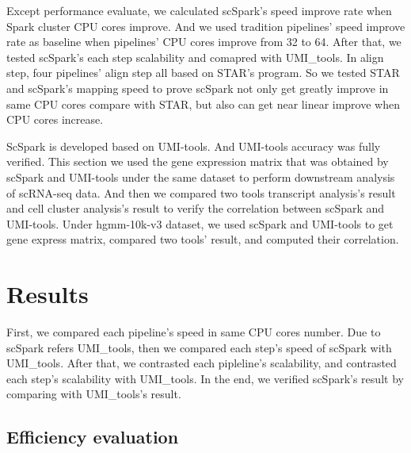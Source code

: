 \documentclass[conference]{IEEEtran}
\begin{document}
Except performance evaluate, we calculated scSpark's speed improve rate when Spark cluster CPU cores improve.
And we used tradition pipelines' speed improve rate as baseline when pipelines' CPU cores improve from 32 to 64.
After that, we tested scSpark's each step scalability and comapred with UMI\_tools.
In align step, four pipelines' align step all based on STAR's program.
So we tested STAR and scSpark's mapping speed to prove scSpark not only get greatly improve in same CPU cores compare with STAR, but also can get near linear improve when CPU cores increase.

ScSpark is developed based on UMI-tools. 
And UMI-tools accuracy was fully verified. 
This section we used the gene expression matrix that was obtained by scSpark and UMI-tools under the same dataset to perform downstream analysis of scRNA-seq data. 
And then we compared two tools transcript analysis's result and cell cluster analysis's result to verify the correlation between scSpark and UMI-tools. 
Under hgmm-10k-v3 dataset, we used scSpark and UMI-tools to get gene express matrix, compared two tools' result, and computed their correlation.

\section{Results}
First, we compared each pipeline's speed in same CPU cores number.
Due to scSpark refers UMI\_tools, then we compared each step's speed of scSpark with UMI\_tools.
After that, we contrasted each pipleline's scalability, and contrasted each step's scalability with UMI\_tools.
In the end, we verified scSpark's result by comparing with UMI\_tools's result.
\subsection{Efficiency evaluation}
\end{document}
